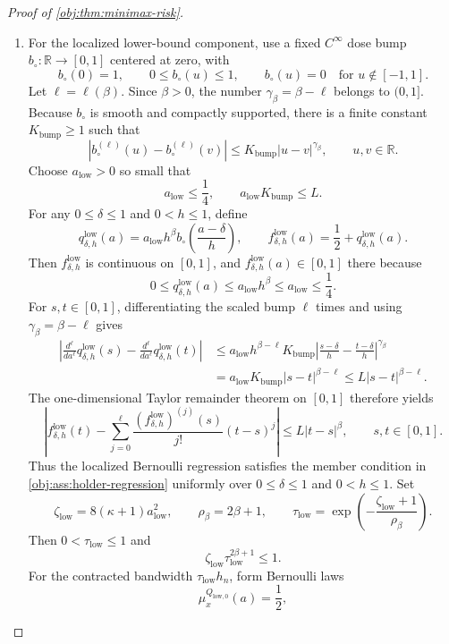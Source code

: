 \documentclass[11pt]{article}
\begin{document}
\begin{proof}[Proof of \cref{obj:thm:minimax-risk}]
\begin{enumerate}
\item For the localized lower-bound component, use a fixed \(C^\infty\) dose bump
\(b_\circ:\mathbb R\to[0,1]\) centered at zero, with
\[
b_\circ(0)=1,
\qquad
0\le b_\circ(u)\le1,
\qquad
b_\circ(u)=0\quad\text{for }u\notin[-1,1].
\]
Let \(\ell=\ell(\beta)\).  Since \(\beta>0\), the number
\(\gamma_\beta=\beta-\ell\) belongs to \((0,1]\).  Because \(b_\circ\) is smooth and
compactly supported, there is a finite constant \(K_{\mathrm{bump}}\ge1\) such that
\[
\left|
b_\circ^{(\ell)}(u)-b_\circ^{(\ell)}(v)
\right|
\le
K_{\mathrm{bump}}|u-v|^{\gamma_\beta},
\qquad u,v\in\mathbb R.
\]
Choose \(a_{\mathrm{low}}>0\) so small that
\[
a_{\mathrm{low}}\le\frac14,
\qquad
a_{\mathrm{low}}K_{\mathrm{bump}}\le L .
\]
For any \(0\le\delta\le1\) and \(0<h\le1\), define
\[
q_{\delta,h}^{\mathrm{low}}(a)
=
a_{\mathrm{low}}h^\beta
b_\circ\!\left(\frac{a-\delta}{h}\right),
\qquad
f_{\delta,h}^{\mathrm{low}}(a)
=
\frac12+q_{\delta,h}^{\mathrm{low}}(a).
\]
Then \(f_{\delta,h}^{\mathrm{low}}\) is continuous on \([0,1]\), and
\(f_{\delta,h}^{\mathrm{low}}(a)\in[0,1]\) there because
\[
0\le q_{\delta,h}^{\mathrm{low}}(a)\le a_{\mathrm{low}}h^\beta\le a_{\mathrm{low}}\le\frac14 .
\]
For \(s,t\in[0,1]\), differentiating the scaled bump \(\ell\) times and using
\(\gamma_\beta=\beta-\ell\) gives
\[
\begin{aligned}
\left|
\frac{d^\ell}{da^\ell}q_{\delta,h}^{\mathrm{low}}(s)
-
\frac{d^\ell}{da^\ell}q_{\delta,h}^{\mathrm{low}}(t)
\right|
&\le
 a_{\mathrm{low}}h^{\beta-\ell}K_{\mathrm{bump}}
 \left|\frac{s-\delta}{h}-\frac{t-\delta}{h}\right|^{\gamma_\beta} \\
&=
 a_{\mathrm{low}}K_{\mathrm{bump}}|s-t|^{\beta-\ell}
\le
 L|s-t|^{\beta-\ell}.
\end{aligned}
\]
The one-dimensional Taylor remainder theorem on \([0,1]\) therefore yields
\[
\left|
f_{\delta,h}^{\mathrm{low}}(t)
-
\sum_{j=0}^{\ell}
\frac{(f_{\delta,h}^{\mathrm{low}})^{(j)}(s)}{j!}(t-s)^j
\right|
\le
L|t-s|^\beta,
\qquad s,t\in[0,1].
\]
Thus the localized Bernoulli regression satisfies the member condition in
\cref{obj:ass:holder-regression} uniformly over \(0\le\delta\le1\) and \(0<h\le1\).
Set
\[
\zeta_{\mathrm{low}}=8(\kappa+1)a_{\mathrm{low}}^2,
\qquad
\rho_\beta=2\beta+1,
\qquad
\tau_{\mathrm{low}}
=
\exp\!\left(-\frac{\zeta_{\mathrm{low}}+1}{\rho_\beta}\right).
\]
Then \(0<\tau_{\mathrm{low}}\le1\) and
\[
\zeta_{\mathrm{low}}\tau_{\mathrm{low}}^{2\beta+1}\le1.
\]
For the contracted bandwidth \(\tau_{\mathrm{low}}h_n\), form Bernoulli laws
\[
\mu_x^{Q_{\mathrm{low},0}}(a)=\frac12,
\]
\end{enumerate}
\end{proof}
\end{document}
